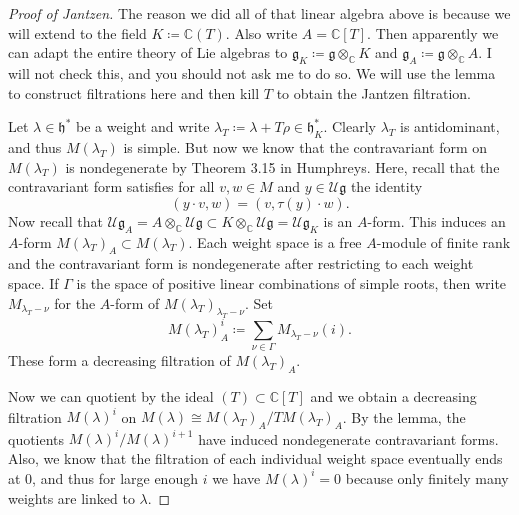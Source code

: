 \documentclass[leqno, openany]{memoir}
\theoremstyle{definition}
\theoremstyle{remark}
\theoremstyle{plain}
\theoremstyle{definition}
\theoremstyle{remark}
\newcommand{\C}{\mathbb{C}}
\newcommand{\U}{\mathcal{U}}
\newcommand{\g}{\mathfrak{g}}
\newcommand{\h}{\mathfrak{h}}
\begin{document}
\begin{proof}[Proof of Jantzen]
  The reason we did all of that linear algebra above is because we will extend to the field $K \coloneqq \C(T)$. Also write $A = \C[T]$. Then apparently we can adapt the entire theory of Lie algebras to $\g_K \coloneqq \g \otimes_{\C} K$ and $\g_A \coloneqq \g \otimes_{\C} A$. I will not check this, and you should not ask me to do so. We will use the lemma to construct filtrations here and then kill $T$ to obtain the Jantzen filtration.

  Let $\lambda \in \h^*$ be a weight and write $\lambda_T \coloneqq \lambda + T \rho \in \h^*_K$. Clearly $\lambda_T$ is antidominant, and thus $M(\lambda_T)$ is simple. But now we know that the contravariant form on $M(\lambda_T)$ is nondegenerate by Theorem 3.15 in Humphreys. Here, recall that the contravariant form satisfies for all $v, w \in M$ and $y \in \U \g$ the identity
  \[ (y \cdot v, w) = (v, \tau(y) \cdot w). \]
  Now recall that $\U \g_A = A \otimes_{\C} \U \g \subset K \otimes_{\C} \U \g = \U \g_K$ is an $A$-form. This induces an $A$-form $M(\lambda_T)_A \subset M(\lambda_T)$. Each weight space is a free $A$-module of finite rank and the contravariant form is nondegenerate after restricting to each weight space. If $\Gamma$ is the space of positive linear combinations of simple roots, then write $M_{\lambda_T - \nu}$ for the $A$-form of $M(\lambda_T)_{\lambda_T - \nu}$. Set
  \[ M(\lambda_T)_A^i \coloneqq \sum_{\nu \in \Gamma} M_{\lambda_T - \nu}(i). \]
  These form a decreasing filtration of $M(\lambda_T)_A$.

  Now we can quotient by the ideal $(T) \subset \C[T]$ and we obtain a decreasing filtration $M(\lambda)^i$ on $M(\lambda) \cong M(\lambda_T)_A / T M(\lambda_T)_A$. By the lemma, the quotients $M(\lambda)^i / M(\lambda)^{i+1}$ have induced nondegenerate contravariant forms. Also, we know that the filtration of each individual weight space eventually ends at $0$, and thus for large enough $i$ we have $M(\lambda)^i = 0$ because only finitely many weights are linked to $\lambda$.


\end{proof}
\end{document}
